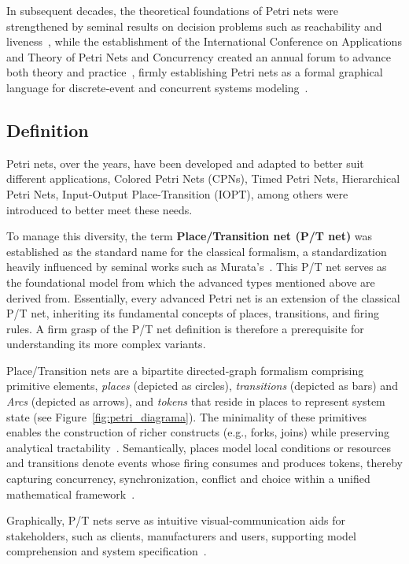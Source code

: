In subsequent decades, the theoretical foundations of Petri nets were strengthened by seminal results on decision problems such as reachability and liveness~\cite{murata}, while the establishment of the International Conference on Applications and Theory of Petri Nets and Concurrency created an annual forum to advance both theory and practice~\cite{ICPN1980}, firmly establishing Petri nets as a formal graphical language for discrete‐event and concurrent systems modeling~\cite{WikiPetriNet2025}.

\subsection{Definition}
\label{subsec:definition}


Petri nets, over the years, have been developed and adapted to better suit different applications,  Colored Petri Nets (CPNs), Timed Petri Nets, Hierarchical Petri Nets, Input-Output Place-Transition (IOPT), among others were introduced to better meet these needs. 


To manage this diversity, the term \textbf{Place/Transition net (P/T net)} was established as the standard name for the classical formalism, a standardization heavily influenced by seminal works such as Murata's~\cite{murata}. This P/T net serves as the foundational model from which the advanced types mentioned above are derived from. Essentially, every advanced Petri net is an extension of the classical P/T net, inheriting its fundamental concepts of places, transitions, and firing rules. A firm grasp of the P/T net definition is therefore a prerequisite for understanding its more complex variants.

Place/Transition nets are a bipartite directed‐graph formalism comprising primitive elements, \emph{places} (depicted as circles), \emph{transitions} (depicted as bars) and \emph{Arcs} (depicted as arrows), and \emph{tokens} that reside in places to represent system state (see Figure~\ref{fig:petri_diagrama}). The minimality of these primitives enables the construction of richer constructs (e.g., forks, joins) while preserving analytical tractability~\cite{50-years}. Semantically, places model local conditions or resources and transitions denote events whose firing consumes and produces tokens, thereby capturing concurrency, synchronization, conflict and choice within a unified mathematical framework~\cite{50-years}. 

Graphically, P/T nets serve as intuitive visual‐communication aids for stakeholders, such as clients, manufacturers and users, supporting model comprehension and system specification~\cite{pn-Wolfgang}.

